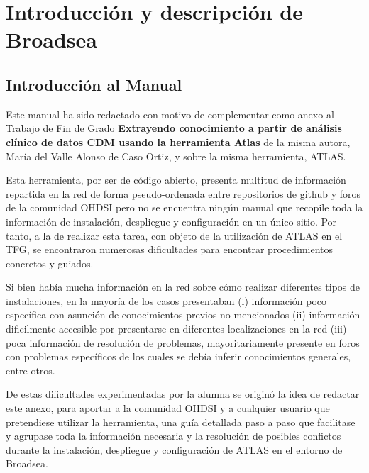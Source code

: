 \chapter{Introducción y descripción de Broadsea} \label{cap:01Introduccion}

\section{Introducción al Manual} \label{sec:01IntroManual}

Este manual ha sido redactado con motivo de complementar como anexo al Trabajo de Fin de Grado \textbf{Extrayendo conocimiento a partir de análisis clínico de datos CDM usando la herramienta Atlas}
de la misma autora, María del Valle Alonso de Caso Ortiz, y sobre la misma herramienta, ATLAS.


Esta herramienta, por ser de código abierto, presenta multitud de información repartida en la red de forma pseudo-ordenada entre repositorios de github y foros de la comunidad OHDSI pero no se encuentra ningún manual que recopile toda la información de instalación,  despliegue y configuración en un único sitio. Por tanto, a la de realizar esta tarea, con objeto de la utilización de ATLAS en el TFG, se encontraron numerosas dificultades para encontrar procedimientos concretos y guiados.

Si bien había mucha información en la red sobre cómo realizar diferentes tipos de instalaciones, en la mayoría de los casos presentaban (i) información poco específica con asunción de conocimientos previos no mencionados (ii) información dificilmente accesible por presentarse en diferentes localizaciones en la red (iii) poca información de resolución de problemas, mayoritariamente presente en foros con problemas específicos de los cuales se debía inferir conocimientos generales, entre otros.  

De estas dificultades experimentadas por la alumna se originó la idea de redactar este anexo, para aportar a la comunidad OHDSI y a cualquier usuario que pretendiese utilizar la herramienta, una guía detallada paso a paso que facilitase y agrupase toda la información necesaria y la resolución de posibles confictos durante la instalación, despliegue y configuración de ATLAS en el entorno de Broadsea. 

